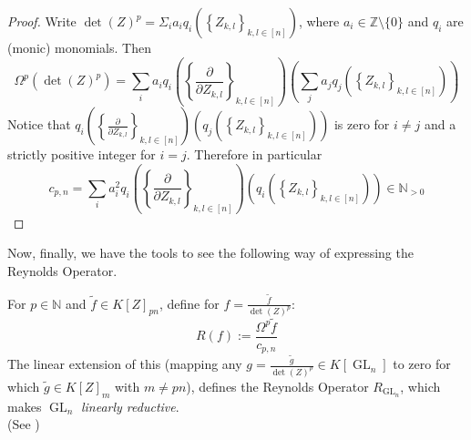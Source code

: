 \begin{proof}
  Write $ \operatorname{det} (Z)^p = \Sigma_i a_i q_i \left( \left\{ Z_{k,l} \right\}_{k,l \in [ n ]} \right) $, where $a_i \in \mathbb{Z} \setminus \{0\}$ and $q_i$ are (monic) monomials.
  Then
  \begin{equation}
    \Omega^p \left( \operatorname{det} (Z)^p \right)
    = \sum_i a_i q_i \left( \left\{ \frac{\partial}{\partial Z_{k,l}} \right\}_{k,l \in [ n ]} \right) \left( \sum_j a_j q_j \left( \left\{ Z_{k,l} \right\}_{k,l \in [ n ]} \right) \right)
  \end{equation}
  Notice that $ q_i \left( \left\{ \frac{\partial}{\partial Z_{k,l}} \right\}_{k,l \in [ n ]} \right) \left( q_j \left( \left\{ Z_{k,l} \right\}_{k,l \in [ n ]} \right) \right) $ is zero for $ i \neq j $ and a strictly positive integer for $ i = j $.
  Therefore in particular
  \begin{equation}
    c_{p,n}
    = \sum_i a_i^2 q_i \left( \left\{ \frac{\partial}{\partial Z_{k,l}} \right\}_{k,l \in [ n ]} \right) \left( q_i \left( \left\{ Z_{k,l} \right\}_{k,l \in [ n ]} \right) \right) \in \mathbb{N}_{>0}
  \end{equation}
\end{proof}
Now, finally, we have the tools to see the following way of expressing the Reynolds Operator.
\begin{theorem}
  For $ p \in \mathbb{N} $ and $ \tilde{f} \in K \left\lbrack Z \right\rbrack_{pn} $, define for $ f = \frac{\tilde{f}}{\operatorname{det}(Z)^p}$:
  \begin{equation}
    R \left( f \right) := \frac{\Omega^p \tilde{f}}{c_{p,n}}
  \end{equation}
  The linear extension of this (mapping any $g = \frac{\tilde{g}}{\operatorname{det}(Z)^p} \in K[\operatorname{GL}_n]$ to zero for which $\tilde{g} \in K[Z]_m$ with $m \neq pn$), defines the Reynolds Operator $R_{\operatorname{GL}_n}$, which makes $\operatorname{GL}_n$ \textit{linearly reductive}.  \\
  (See \cite[4.5.27]{DK15})
\end{theorem}

